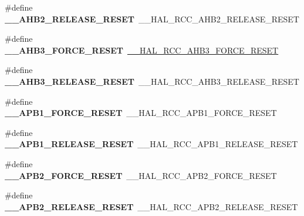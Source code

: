 \begin{DoxyCompactItemize}
\#define {\bfseries \+\_\+\+\_\+\+A\+H\+B2\+\_\+\+R\+E\+L\+E\+A\+S\+E\+\_\+\+R\+E\+S\+ET}~\+\_\+\+\_\+\+H\+A\+L\+\_\+\+R\+C\+C\+\_\+\+A\+H\+B2\+\_\+\+R\+E\+L\+E\+A\+S\+E\+\_\+\+R\+E\+S\+ET
\item 
\mbox{\label{group___h_a_l___r_c_c___aliased_ga967e453f7a2dc917a2f43041bc3530bc}} 
\#define {\bfseries \+\_\+\+\_\+\+A\+H\+B3\+\_\+\+F\+O\+R\+C\+E\+\_\+\+R\+E\+S\+ET}~\mbox{\hyperlink{group___r_c_c_ex___force___release___peripheral___reset_ga230a57ed6c129076b4fd17bdb07d79f6}{\+\_\+\+\_\+\+H\+A\+L\+\_\+\+R\+C\+C\+\_\+\+A\+H\+B3\+\_\+\+F\+O\+R\+C\+E\+\_\+\+R\+E\+S\+ET}}
\item 
\mbox{\label{group___h_a_l___r_c_c___aliased_gacf2ccc00726b7722836cddb8f42db97c}} 
\#define {\bfseries \+\_\+\+\_\+\+A\+H\+B3\+\_\+\+R\+E\+L\+E\+A\+S\+E\+\_\+\+R\+E\+S\+ET}~\+\_\+\+\_\+\+H\+A\+L\+\_\+\+R\+C\+C\+\_\+\+A\+H\+B3\+\_\+\+R\+E\+L\+E\+A\+S\+E\+\_\+\+R\+E\+S\+ET
\item 
\mbox{\label{group___h_a_l___r_c_c___aliased_gad52dd8358580ee80c5d66fb0ae3208fa}} 
\#define {\bfseries \+\_\+\+\_\+\+A\+P\+B1\+\_\+\+F\+O\+R\+C\+E\+\_\+\+R\+E\+S\+ET}~\+\_\+\+\_\+\+H\+A\+L\+\_\+\+R\+C\+C\+\_\+\+A\+P\+B1\+\_\+\+F\+O\+R\+C\+E\+\_\+\+R\+E\+S\+ET
\item 
\mbox{\label{group___h_a_l___r_c_c___aliased_ga497e83304224dd4740b388fe296beaf0}} 
\#define {\bfseries \+\_\+\+\_\+\+A\+P\+B1\+\_\+\+R\+E\+L\+E\+A\+S\+E\+\_\+\+R\+E\+S\+ET}~\+\_\+\+\_\+\+H\+A\+L\+\_\+\+R\+C\+C\+\_\+\+A\+P\+B1\+\_\+\+R\+E\+L\+E\+A\+S\+E\+\_\+\+R\+E\+S\+ET
\item 
\mbox{\label{group___h_a_l___r_c_c___aliased_ga92a0e6fcc37827864d686e5d023d8472}} 
\#define {\bfseries \+\_\+\+\_\+\+A\+P\+B2\+\_\+\+F\+O\+R\+C\+E\+\_\+\+R\+E\+S\+ET}~\+\_\+\+\_\+\+H\+A\+L\+\_\+\+R\+C\+C\+\_\+\+A\+P\+B2\+\_\+\+F\+O\+R\+C\+E\+\_\+\+R\+E\+S\+ET
\item 
\mbox{\label{group___h_a_l___r_c_c___aliased_ga68340225a9f3449d73f454972cf01726}} 
\#define {\bfseries \+\_\+\+\_\+\+A\+P\+B2\+\_\+\+R\+E\+L\+E\+A\+S\+E\+\_\+\+R\+E\+S\+ET}~\+\_\+\+\_\+\+H\+A\+L\+\_\+\+R\+C\+C\+\_\+\+A\+P\+B2\+\_\+\+R\+E\+L\+E\+A\+S\+E\+\_\+\+R\+E\+S\+ET

\end{DoxyCompactItemize}
